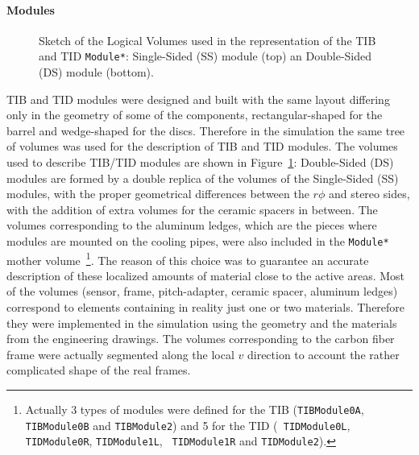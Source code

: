 \documentclass{cmspaper}
\begin{document}
\paragraph{Modules}
\begin{figure}[hbtp]
  \begin{center}
    \caption{Sketch of the Logical Volumes used in the representation
    of the TIB and TID {\tt *Module*}: Single-Sided (SS) module (top)
    an Double-Sided (DS) module (bottom).}
    \label{fig:module}
  \end{center}
\end{figure}
TIB and TID modules were designed and built with the same layout
differing only in the geometry of some of the components, rectangular-shaped
for the barrel and wedge-shaped for the discs.
Therefore in the simulation the same tree of volumes was used for the
description of TIB and TID modules. 
The volumes used to describe TIB/TID modules are shown in 
Figure~\ref{fig:module}: Double-Sided (DS) modules are 
formed by a double replica of the volumes of the Single-Sided (SS) modules,
with the proper geometrical differences between the $r\phi$ and stereo sides,
with the addition of extra volumes for the ceramic spacers in between. 
The volumes corresponding to the aluminum ledges,
which are the pieces where modules are mounted on the cooling pipes, were also
included in the  {\tt *Module*} mother volume~\footnote{Actually 3 types
  of modules were defined for the TIB ({\tt TIBModule0A}, {\tt
    TIBModule0B} and {\tt TIBModule2}) and 5 for the TID ({\tt
    TIDModule0L}, {\tt TIDModule0R}, {\tt TIDModule1L}, {\tt
    TIDModule1R} and {\tt TIDModule2}).}. 
The reason of this choice was to guarantee an accurate description of
these localized amounts of material close to the active areas. 
Most of the volumes (sensor, frame, pitch-adapter, ceramic spacer,
aluminum ledges) correspond to elements containing in reality just one
or two materials. Therefore they were implemented in the simulation
using the geometry and the materials from the engineering drawings.
The volumes corresponding to the carbon fiber frame were actually
segmented along the local $v$ direction to account the rather
complicated shape of the real frames. 
\end{document}
